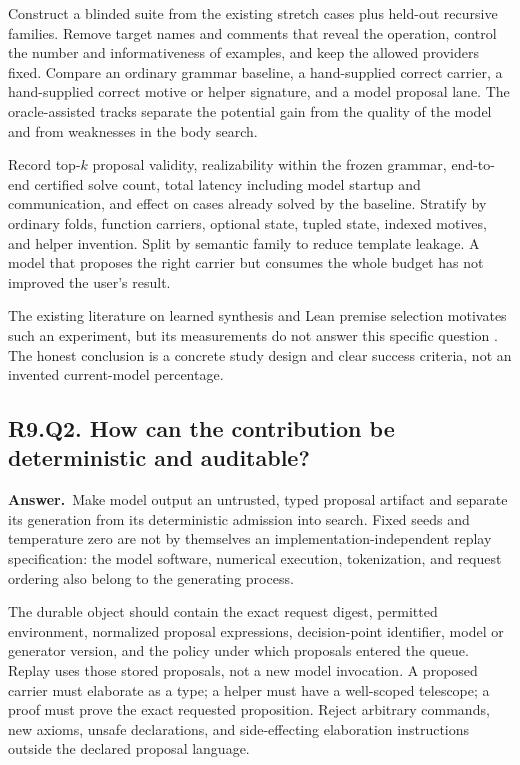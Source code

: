 \documentclass[11pt,a4paper]{article}
\theoremstyle{definition}
\theoremstyle{remark}
\newcommand{\answer}{\par\noindent\textbf{Answer.}\ }
\newcommand{\qheading}[2]{\subsection{#1. #2}}
\begin{document}
Construct a blinded suite from the existing stretch cases plus held-out
recursive families. Remove target names and comments that reveal the operation,
control the number and informativeness of examples, and keep the allowed
providers fixed. Compare an ordinary grammar baseline, a hand-supplied correct
carrier, a hand-supplied correct motive or helper signature, and a model
proposal lane. The oracle-assisted tracks separate the potential gain from
the quality of the model and from weaknesses in the body search.

Record top-$k$ proposal validity, realizability within the frozen grammar,
end-to-end certified solve count, total latency including model startup and
communication, and effect on cases already solved by the baseline. Stratify
by ordinary folds, function carriers, optional state, tupled state, indexed
motives, and helper invention. Split by semantic family to reduce template
leakage. A model that proposes the right carrier but consumes the whole budget
has not improved the user's result.

The existing literature on learned synthesis and Lean premise selection motivates
such an experiment, but its measurements do not answer this specific question
\cite{deepcoder,dreamcoder,leandojo}. The honest conclusion is a concrete study
design and clear success criteria, not an invented current-model percentage.

\qheading{R9.Q2}{How can the contribution be deterministic and auditable?}
\answer Make model output an untrusted, typed proposal artifact and separate
its generation from its deterministic admission into search. Fixed seeds and
temperature zero are not by themselves an implementation-independent replay
specification: the model software, numerical execution, tokenization, and
request ordering also belong to the generating process.

The durable object should contain the exact request digest, permitted
environment, normalized proposal expressions, decision-point identifier, model
or generator version, and the policy under which proposals entered the queue.
Replay uses those stored proposals, not a new model invocation. A proposed
carrier must elaborate as a type; a helper must have a well-scoped telescope;
a proof must prove the exact requested proposition. Reject arbitrary commands,
new axioms, unsafe declarations, and side-effecting elaboration instructions
outside the declared proposal language.
\end{document}
